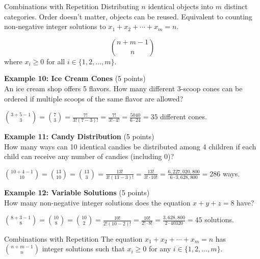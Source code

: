 \begin{define}{Combinations with Repetition}
    Distributing $n$ identical objects into $m$ distinct categories. 
    Order doesn't matter, objects can be reused. Equivalent to counting 
    non-negative integer solutions to $x_1+x_2+\cdots+x_m=n$.
    
    $$\binom{n+m-1}{n}$$
    where $x_i \geq 0$ for all $i \in\{1,2, \ldots, m\}$.
  \end{define}

\textbf{Example 10: Ice Cream Cones} (5 points)\\
An ice cream shop offers 5 flavors. How many different 3-scoop cones can be ordered if multiple scoops of the same flavor are allowed?
\begin{subanswer}
    $\binom{3+5-1}{3} = \binom{7}{3} = \frac{7!}{3!(7-3)!} = \frac{7!}{3! \cdot 4!} = \frac{5040}{6 \cdot 24} = 35$ different cones.
\end{subanswer}

\textbf{Example 11: Candy Distribution} (5 points)\\
How many ways can 10 identical candies be distributed among 4 children if each child can receive any number of candies (including 0)?
\begin{subanswer}
    $\binom{10+4-1}{10} = \binom{13}{10} = \binom{13}{3} = \frac{13!}{3!(13-3)!} = \frac{13!}{3! \cdot 10!} = \frac{6,227,020,800}{6 \cdot 3,628,800} = 286$ ways.
\end{subanswer}

\textbf{Example 12: Variable Solutions} (5 points)\\
How many non-negative integer solutions does the equation $x + y + z = 8$ have?
\begin{subanswer}
    $\binom{8+3-1}{8} = \binom{10}{8} = \binom{10}{2} = \frac{10!}{2!(10-2)!} = \frac{10!}{2! \cdot 8!} = \frac{3,628,800}{2 \cdot 40320} = 45$ solutions.
\end{subanswer}


\newpage

\begin{define}{Combinations with Repetition}
    The equation $x_1+x_2+\cdots+x_m=n$ has $\binom{n+m-1}{n}$ integer solutions such that $x_i \geq 0$ for any $i \in\{1,2, \ldots, m\}$.
  \end{define}
  
  
  
